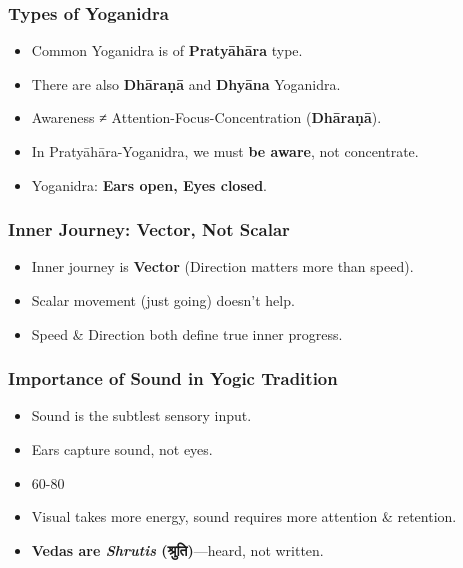 \begin{frame}[fragile]\frametitle{Types of Yoganidra}
      \begin{itemize}
      \item Common Yoganidra is of \textbf{Pratyāhāra} type.
      \item There are also \textbf{Dhāraṇā} and \textbf{Dhyāna} Yoganidra.
      \item Awareness ≠ Attention-Focus-Concentration (\textbf{Dhāraṇā}).
      \item In Pratyāhāra-Yoganidra, we must \textbf{be aware}, not concentrate.
      \item Yoganidra: \textbf{Ears open, Eyes closed}.
      \end{itemize}
\end{frame}

\begin{frame}[fragile]\frametitle{Inner Journey: Vector, Not Scalar}
      \begin{itemize}
      \item Inner journey is \textbf{Vector} (Direction matters more than speed).
      \item Scalar movement (just going) doesn't help.
      \item Speed \& Direction both define true inner progress.
      \end{itemize}
\end{frame}

\begin{frame}[fragile]\frametitle{Importance of Sound in Yogic Tradition}
      \begin{itemize}
      \item Sound is the subtlest sensory input.
      \item Ears capture sound, not eyes.
      \item 60-80%
      \item Visual takes more energy, sound requires more attention \& retention.
      \item \textbf{Vedas are \textit{Shrutis} (श्रुति)}—heard, not written.
      \end{itemize}
\end{frame}

